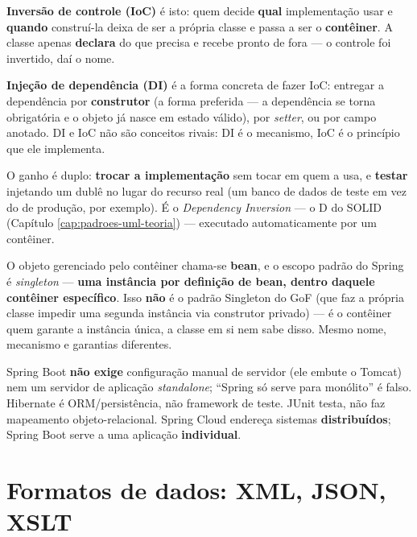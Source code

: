 \begin{conceito}
\textbf{Inversão de controle (IoC)} é isto: quem decide \textbf{qual}
implementação usar e \textbf{quando} construí-la deixa de ser a própria
classe e passa a ser o \textbf{contêiner}. A classe apenas
\textbf{declara} do que precisa e recebe pronto de fora --- o controle foi
invertido, daí o nome.

\textbf{Injeção de dependência (DI)} é a forma concreta de fazer IoC:
entregar a dependência por \textbf{construtor} (a forma preferida --- a
dependência se torna obrigatória e o objeto já nasce em estado válido),
por \textit{setter}, ou por campo anotado. DI e IoC não são conceitos
rivais: DI é o mecanismo, IoC é o princípio que ele implementa.

O ganho é duplo: \textbf{trocar a implementação} sem tocar em quem a usa,
e \textbf{testar} injetando um dublê no lugar do recurso real (um banco de
dados de teste em vez do de produção, por exemplo). É o
\textit{Dependency Inversion} --- o D do SOLID (Capítulo
\ref{cap:padroes-uml-teoria}) --- executado automaticamente por um
contêiner.

O objeto gerenciado pelo contêiner chama-se \textbf{bean}, e o escopo
padrão do Spring é \textit{singleton} --- \textbf{uma instância por
definição de bean, dentro daquele contêiner específico}. Isso \textbf{não}
é o padrão Singleton do GoF (que faz a própria classe impedir uma segunda
instância via construtor privado) --- é o contêiner quem garante a
instância única, a classe em si nem sabe disso. Mesmo nome, mecanismo e
garantias diferentes.
\end{conceito}

\begin{cuidado}
Spring Boot \textbf{não exige} configuração manual de servidor (ele
embute o Tomcat) nem um servidor de aplicação \textit{standalone}; “Spring
só serve para monólito” é falso. Hibernate é ORM/persistência, não
framework de teste. JUnit testa, não faz mapeamento objeto-relacional.
Spring Cloud endereça sistemas \textbf{distribuídos}; Spring Boot serve a
uma aplicação \textbf{individual}.
\end{cuidado}

\section{Formatos de dados: XML, JSON, XSLT}

